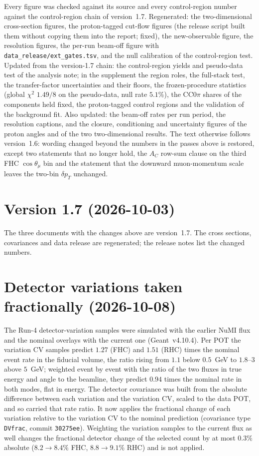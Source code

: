 Every figure was checked against its source and every control-region number against the control-region chain of
version~1.7. Regenerated: the two-dimensional cross-section figures, the proton-tagged cut-flow figures (the release
script built them without copying them into the report; fixed), the new-observable figure, the resolution figures,
the per-run beam-off figure with \texttt{data\_release/ext\_gates.tsv}, and the null calibration of the control-region
test. Updated from the version-1.7 chain: the control-region yields and pseudo-data test of the analysis note; in the
supplement the region roles, the full-stack test, the transfer-factor uncertainties and their floors, the frozen-procedure
statistics (global $\chi^2$ $1.49/8$ on the pseudo-data, null rate $5.1\%$), the CC$0\pi$ shares of the components
held fixed, the proton-tagged control regions and the validation of the background fit. Also updated: the beam-off
rates per run period, the resolution captions, and the closure, conditioning and uncertainty figures of the proton
angles and of the two two-dimensional results. The text otherwise follows version~1.6: wording changed beyond the
numbers in the passes above is restored, except two statements that no longer hold, the $A_C$ row-sum clause on the
third FHC $\cos\theta_\mu$ bin and the statement that the downward muon-momentum scale leaves the two-bin $\delta p_T$
unchanged.

\section{Version 1.7 (2026-10-03)}

The three documents with the changes above are version~1.7. The cross sections, covariances and data release are
regenerated; the release notes list the changed numbers.

\section{Detector variations taken fractionally (2026-10-08)}

The Run-4 detector-variation samples were simulated with the earlier NuMI flux and the nominal overlays with
the current one (Geant~v4.10.4). Per POT the variation CV samples predict $1.27$ (FHC) and $1.51$ (RHC) times
the nominal event rate in the fiducial volume, the ratio rising from $1.1$ below $0.5$~GeV to $1.8$--$3$
above $5$~GeV; weighted event by event with the ratio of the two fluxes in true energy and angle to the
beamline, they predict $0.94$ times the nominal rate in both modes, flat in energy. The detector covariance
was built from the absolute difference between each variation and the variation CV, scaled to the data POT,
and so carried that rate ratio. It now applies the fractional change of each variation relative to the
variation CV to the nominal prediction (covariance type \texttt{DVfrac}, commit \texttt{30275ee}). Weighting
the variation samples to the current flux as well changes the fractional detector change of the selected
count by at most $0.3\%$ absolute ($8.2\to8.4\%$ FHC, $8.8\to9.1\%$ RHC) and is not applied.

